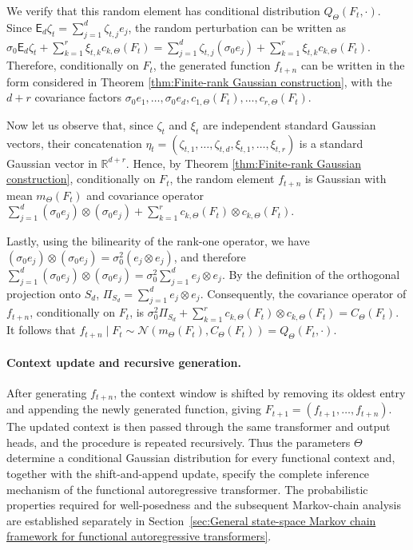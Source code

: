We verify that this random element has conditional distribution \(Q_\Theta(F_t,\cdot)\). Since \(\mathsf E_d\zeta_t=\sum_{j=1}^d\zeta_{t,j}e_j\), the random perturbation can be written as \(\sigma_0\mathsf E_d\zeta_t+\sum_{k=1}^r\xi_{t,k}c_{k,\Theta}(F_t)=\sum_{j=1}^d\zeta_{t,j}(\sigma_0e_j)+\sum_{k=1}^r\xi_{t,k}c_{k,\Theta}(F_t)\). Therefore, conditionally on \(F_t\), the generated function \(f_{t+n}\) can be written in the form considered in Theorem \ref{thm:Finite-rank Gaussian construction}, with the \(d+r\) covariance factors \(\sigma_0e_1,\ldots,\sigma_0e_d,c_{1,\Theta}(F_t),\ldots,c_{r,\Theta}(F_t)\).

Now let us observe that, since \(\zeta_t\) and \(\xi_t\) are independent standard Gaussian vectors, their concatenation \(\eta_t=(\zeta_{t,1},\ldots,\zeta_{t,d},\xi_{t,1},\ldots,\xi_{t,r})\) is a standard Gaussian vector in \(\mathbb R^{d+r}\). Hence, by Theorem \ref{thm:Finite-rank Gaussian construction}, conditionally on \(F_t\), the random element \(f_{t+n}\) is Gaussian with mean \(m_\Theta(F_t)\) and covariance operator \(\sum_{j=1}^d(\sigma_0e_j)\otimes(\sigma_0e_j)+\sum_{k=1}^rc_{k,\Theta}(F_t)\otimes c_{k,\Theta}(F_t)\).

Lastly, using the bilinearity of the rank-one operator, we have \((\sigma_0e_j)\otimes(\sigma_0e_j)=\sigma_0^2(e_j\otimes e_j)\), and therefore \(\sum_{j=1}^d(\sigma_0e_j)\otimes(\sigma_0e_j)=\sigma_0^2\sum_{j=1}^de_j\otimes e_j\). By the definition of the orthogonal projection onto \(S_d\), \(\Pi_{S_d}=\sum_{j=1}^de_j\otimes e_j\). Consequently, the covariance operator of \(f_{t+n}\), conditionally on \(F_t\), is \(\sigma_0^2\Pi_{S_d}+\sum_{k=1}^rc_{k,\Theta}(F_t)\otimes c_{k,\Theta}(F_t)=C_\Theta(F_t)\).
It follows that \(f_{t+n}\mid F_t\sim\mathcal N(m_\Theta(F_t),C_\Theta(F_t))=Q_\Theta(F_t,\cdot)\).

\paragraph{Context update and recursive generation.}

After generating \(f_{t+n}\), the context window is shifted by removing its oldest entry and appending the newly generated function, giving \(F_{t+1}=(f_{t+1},\ldots,f_{t+n})\).
The updated context is then passed through the same transformer and output heads, and the procedure is repeated recursively. Thus the parameters \(\Theta\) determine a conditional Gaussian distribution for every functional context and, together with the shift-and-append update, specify the complete inference mechanism of the functional autoregressive transformer. The probabilistic properties required for well-posedness and the subsequent Markov-chain analysis are established separately in Section~\ref{sec:General state-space Markov chain framework for functional autoregressive transformers}.